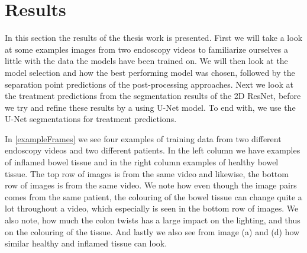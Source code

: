 \section{Results}
In this section the results of the thesis work is presented. First we will take a look at some examples images from two endoscopy videos to familiarize ourselves a little with the data the models have been trained on. We will then look at the model selection and how the best performing model was chosen, followed by the separation point predictions of the post-processing approaches. Next we look at the treatment predictions from the segmentation results of the 2D ResNet, before we try and refine these results by a using U-Net model. To end with, we use the U-Net segmentations for treatment predictions. 

In \autoref{exampleFrames} we see four examples of training data from two different endoscopy videos and two different patients. In the left column we have examples of inflamed bowel tissue and in the right column examples of healthy bowel tissue. The top row of images is from the same video and likewise, the bottom row of images is from the same video. We note how even though the image pairs comes from the same patient, the colouring of the bowel tissue can change quite a lot throughout a video, which especially is seen in the bottom row of images. We also note, how much the colon twists has a large impact on the lighting, and thus on the colouring of the tissue. And lastly we also see from image (a) and (d) how similar healthy and inflamed tissue can look. 

